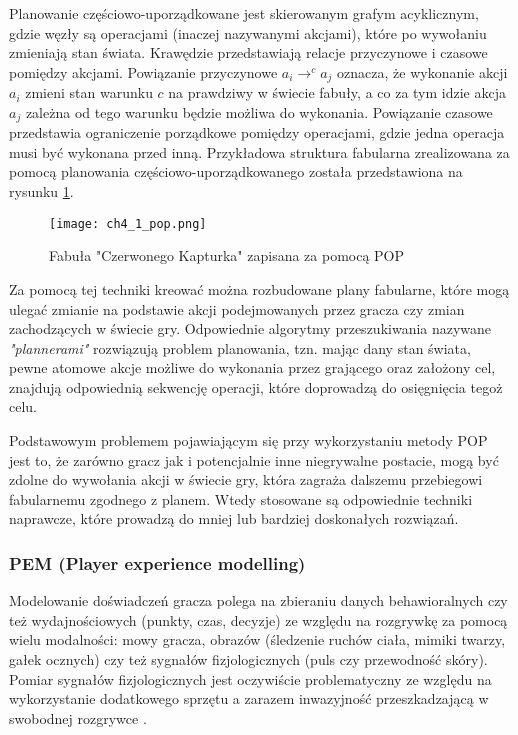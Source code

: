 Planowanie częściowo-uporządkowane jest skierowanym grafym acyklicznym, gdzie węzły są operacjami
(inaczej nazywanymi akcjami), które po wywołaniu zmieniają stan świata. Krawędzie przedstawiają
relacje przyczynowe i czasowe pomiędzy akcjami. Powiązanie przyczynowe $a_{i} \rightarrow^{c}a_{j}$
oznacza, że wykonanie akcji $a_{i}$ zmieni stan warunku $c$ na prawdziwy w świecie fabuły, a co za
tym idzie akcja $a_{j}$ zależna od tego warunku będzie możliwa do wykonania. Powiązanie czasowe
przedstawia ograniczenie porządkowe pomiędzy operacjami, gdzie jedna operacja musi być wykonana przed
inną\cite{game_ai_storytelling}. Przykładowa struktura fabularna zrealizowana za pomocą planowania
częściowo-uporządkowanego została przedstawiona na rysunku \ref{fig:ch4_1_pop}.

\begin{figure}[h]
    \centering
    \texttt{[image: ch4\_1\_pop.png]}
    \caption{Fabuła "Czerwonego Kapturka" zapisana za pomocą POP}
    \label{fig:ch4_1_pop}
\end{figure}

Za pomocą tej techniki kreować można rozbudowane plany fabularne, które mogą ulegać zmianie na
podstawie akcji podejmowanych przez gracza czy zmian zachodzących w świecie gry. Odpowiednie algorytmy
przeszukiwania nazywane \textit{"plannerami"} rozwiązują problem planowania, tzn. mając dany stan
świata, pewne atomowe akcje możliwe do wykonania przez grającego oraz założony cel, znajdują
odpowiednią sekwencję operacji, które doprowadzą do osięgnięcia tegoż celu\cite{game_ai_storytelling}.

Podstawowym problemem pojawiającym się przy wykorzystaniu metody POP jest to, że zarówno gracz jak i
potencjalnie inne niegrywalne postacie, mogą być zdolne do wywołania akcji w świecie gry, która
zagraża dalszemu przebiegowi fabularnemu zgodnego z planem\cite{characters_and_directors}. Wtedy
stosowane są odpowiednie techniki naprawcze, które prowadzą do mniej lub bardziej doskonałych rozwiązań.

\subsubsection*{PEM (Player experience modelling)}

Modelowanie doświadczeń gracza polega na zbieraniu danych behawioralnych czy też wydajnościowych
(punkty, czas, decyzje) ze względu na rozgrywkę za pomocą wielu modalności: mowy gracza, obrazów
(śledzenie ruchów ciała, mimiki twarzy, gałek ocznych) czy też sygnałów fizjologicznych (puls czy
przewodność skóry). Pomiar sygnałów fizjologicznych jest oczywiście problematyczny ze względu na
wykorzystanie dodatkowego sprzętu a zarazem inwazyjność przeszkadzającą w swobodnej rozgrywce
\cite{reusable_game_ai}.

